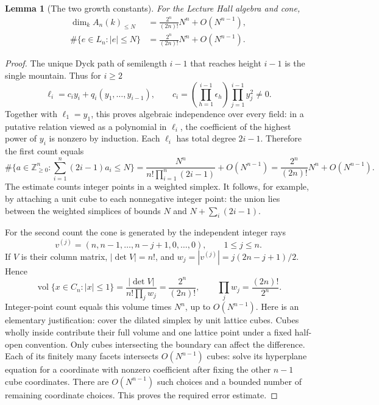 \documentclass[11pt]{article}
\newtheorem{lemma}[theorem]{Lemma}
\theoremstyle{definition}
\theoremstyle{remark}
\newcommand{\N}{\mathbb Z_{\ge0}}
\newcommand{\vol}{\operatorname{vol}}
\begin{document}
\begin{lemma}[The two growth constants]\label{lem:volumes}
For the Lecture Hall algebra and cone,
\begin{align*}
 \dim_k A_n(k)_{\le N}
 &=\frac{2^n}{(2n)!}N^n+O(N^{n-1}),\\
 \#\{e\in L_n:|e|\le N\}
 &=\frac{2^n}{(2n)!}N^n+O(N^{n-1}).
\end{align*}
\end{lemma}
\begin{proof}
The unique Dyck path of semilength $i-1$ that reaches height $i-1$ is the
single mountain. Thus for $i\ge2$
\begin{equation}\label{eq:triangular}
 \ell_i=c_i y_i+q_i(y_1,\ldots,y_{i-1}),\qquad
 c_i=\left(\prod_{h=1}^{i-1}\epsilon_h\right)
          \prod_{j=1}^{i-1}y_j^2\ne0.
\end{equation}
Together with $\ell_1=y_1$, this proves algebraic independence over every
field: in a putative relation viewed as a polynomial in $\ell_i$, the
coefficient of the highest power of $y_i$ is nonzero by induction.
Each $\ell_i$ has total degree $2i-1$. Therefore the first count equals
\[
 \#\{a\in\N^n:\sum_{i=1}^n(2i-1)a_i\le N\}
 =\frac{N^n}{n!\prod_{i=1}^n(2i-1)}+O(N^{n-1})
 =\frac{2^n}{(2n)!}N^n+O(N^{n-1}).
\]
The estimate counts integer points in a weighted simplex. It follows, for
example, by attaching a unit cube to each nonnegative integer point:
the union lies between the weighted simplices of bounds $N$ and
$N+\sum_i(2i-1)$.

For the second count the cone is generated by the independent integer rays
\[
 v^{(j)}=(n,n-1,\ldots,n-j+1,0,\ldots,0),\qquad 1\le j\le n.
\]
If $V$ is their column matrix, $|\det V|=n!$, and
$w_j=|v^{(j)}|=j(2n-j+1)/2$. Hence
\[
 \vol\{x\in C_n:|x|\le1\}
 =\frac{|\det V|}{n!\prod_j w_j}
 =\frac{2^n}{(2n)!},
 \qquad \prod_jw_j=\frac{(2n)!}{2^n}.
\]
Integer-point count equals this volume times $N^n$, up to $O(N^{n-1})$.
Here is an elementary justification: cover the dilated simplex by unit
lattice cubes. Cubes wholly inside contribute their full volume and one
lattice point under a fixed half-open convention. Only cubes intersecting
the boundary can affect the difference. Each of its finitely many facets
intersects $O(N^{n-1})$ cubes: solve its hyperplane equation for a coordinate
with nonzero coefficient after fixing the other $n-1$ cube coordinates.
There are $O(N^{n-1})$ such choices and a bounded number of remaining
coordinate choices. This proves the required error estimate.
\end{proof}
\end{document}
